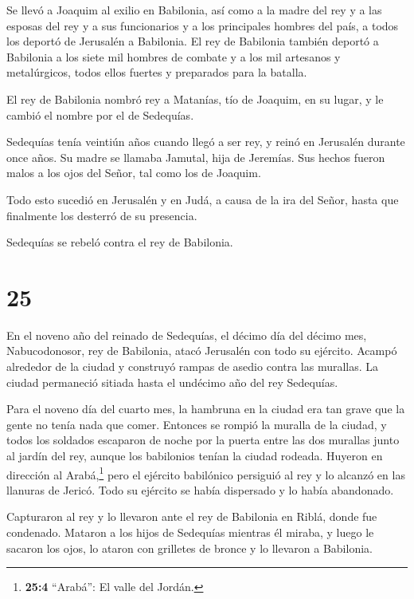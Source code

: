  Se llevó a Joaquim al exilio en Babilonia, así como a la
madre del rey y a las esposas del rey y a sus funcionarios y a los
principales hombres del país, a todos los deportó de Jerusalén a
Babilonia.  El rey de Babilonia también deportó a Babilonia
a los siete mil hombres de combate y a los mil artesanos y metalúrgicos,
todos ellos fuertes y preparados para la batalla.

 El rey de Babilonia nombró rey a Matanías, tío de Joaquim,
en su lugar, y le cambió el nombre por el de Sedequías.

 Sedequías tenía veintiún años cuando llegó a ser rey, y
reinó en Jerusalén durante once años. Su madre se llamaba Jamutal, hija
de Jeremías.  Sus hechos fueron malos a los ojos del Señor,
tal como los de Joaquim.

 Todo esto sucedió en Jerusalén y en Judá, a causa de la
ira del Señor, hasta que finalmente los desterró de su presencia.

Sedequías se rebeló contra el rey de Babilonia.

\hypertarget{section-24}{%
\section{25}\label{section-24}}

 En el noveno año del reinado de Sedequías, el décimo día
del décimo mes, Nabucodonosor, rey de Babilonia, atacó Jerusalén con
todo su ejército. Acampó alrededor de la ciudad y construyó rampas de
asedio contra las murallas.  La ciudad permaneció sitiada
hasta el undécimo año del rey Sedequías.

 Para el noveno día del cuarto mes, la hambruna en la ciudad
era tan grave que la gente no tenía nada que comer. 
Entonces se rompió la muralla de la ciudad, y todos los soldados
escaparon de noche por la puerta entre las dos murallas junto al jardín
del rey, aunque los babilonios tenían la ciudad rodeada. Huyeron en
dirección al Arabá,\footnote{\textbf{25:4} ``Arabá'': El valle del
  Jordán.}  pero el ejército babilónico persiguió al rey y
lo alcanzó en las llanuras de Jericó. Todo su ejército se había
dispersado y lo había abandonado.

 Capturaron al rey y lo llevaron ante el rey de Babilonia en
Riblá, donde fue condenado.  Mataron a los hijos de
Sedequías mientras él miraba, y luego le sacaron los ojos, lo ataron con
grilletes de bronce y lo llevaron a Babilonia.

